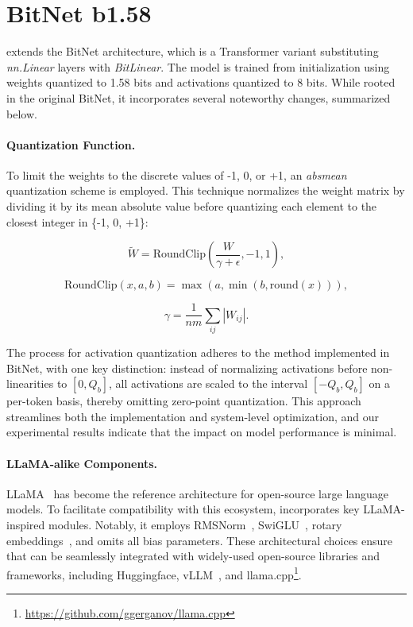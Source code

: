 \section{BitNet b1.58}

 extends the BitNet architecture, which is a Transformer variant substituting \emph{nn.Linear} layers with \emph{BitLinear}. The model is trained from initialization using weights quantized to 1.58 bits and activations quantized to 8 bits. While rooted in the original BitNet, it incorporates several noteworthy changes, summarized below.

\paragraph{Quantization Function.} To limit the weights to the discrete values of -1, 0, or +1, an \emph{absmean} quantization scheme is employed. This technique normalizes the weight matrix by dividing it by its mean absolute value before quantizing each element to the closest integer in \{-1, 0, +1\}:

\begin{equation}
    \widetilde{W} = \mathrm{RoundClip}(\frac{W}{\gamma + \epsilon}, -1, 1),
\end{equation}

\begin{equation}
    \mathrm{RoundClip}(x, a, b) = \max(a, \min(b, \mathrm{round}(x))),
\end{equation}

\begin{equation}
    \gamma = \frac{1}{nm}\sum_{ij} |W_{ij}|.
\end{equation}

The process for activation quantization adheres to the method implemented in BitNet, with one key distinction: instead of normalizing activations before non-linearities to $[0, Q_b]$, all activations are scaled to the interval $[-Q_b, Q_b]$ on a per-token basis, thereby omitting zero-point quantization. This approach streamlines both the implementation and system-level optimization, and our experimental results indicate that the impact on model performance is minimal.

\paragraph{LLaMA-alike Components.}

LLaMA~\cite{llama, llama2} has become the reference architecture for open-source large language models. To facilitate compatibility with this ecosystem,  incorporates key LLaMA-inspired modules. Notably, it employs RMSNorm~\cite{rmsnorm}, SwiGLU~\cite{swiglu}, rotary embeddings~\cite{rope}, and omits all bias parameters. These architectural choices ensure that  can be seamlessly integrated with widely-used open-source libraries and frameworks, including Huggingface, vLLM~\cite{vllm}, and llama.cpp\footnote{\url{https://github.com/ggerganov/llama.cpp}}.


